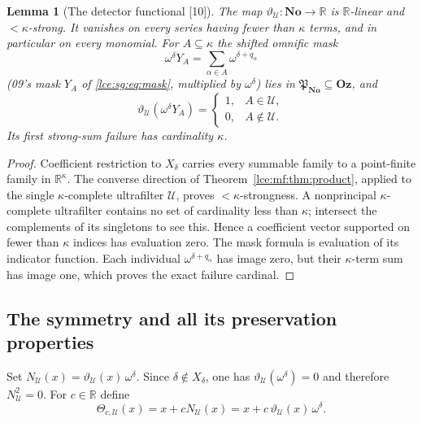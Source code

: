 \documentclass[11pt,letterpaper]{article}
\numberwithin{equation}{section}
\newtheorem{lemma}[theorem]{Lemma}
\theoremstyle{definition}
\theoremstyle{remark}
\newcommand{\No}{\mathbf{No}}
\newcommand{\Oz}{\mathbf{Oz}}
\newcommand{\R}{\mathbb R}
\newcommand{\thref}[1]{Theorem~\ref{#1}}
\newcommand{\src}[1]{\textup{\textsf{\small[#1]}}}%
\begin{document}
\begin{lemma}[The detector functional \src{10}]\label{lce:mf:lem:detector}
The map $\vartheta_{\mathcal U}:\No\to\R$ is $\R$-linear and
${<}\kappa$-strong. It vanishes on every series having fewer than $\kappa$
terms, and in particular on every monomial. For $A\subseteq\kappa$ the
shifted omnific mask
\begin{equation}\label{lce:mf:eq:mask}
 \omega^\delta Y_A=\sum_{\alpha\in A}\omega^{\delta+q_\alpha}
\end{equation}
(09's mask $Y_A$ of \eqref{lce:sg:eq:mask}, multiplied by $\omega^\delta$)
lies in $\mathfrak P_{\No}\subseteq\Oz$, and
\[
 \vartheta_{\mathcal U}(\omega^\delta Y_A)=\begin{cases}1,&A\in\mathcal U,\\
 0,&A\notin\mathcal U.\end{cases}
\]
Its first strong-sum failure has cardinality $\kappa$.
\end{lemma}
\begin{proof}
Coefficient restriction to $X_\delta$ carries every summable family to a
point-finite family in $\R^\kappa$. The converse direction of
\thref{lce:mf:thm:product}, applied to the single $\kappa$-complete
ultrafilter $\mathcal U$, proves ${<}\kappa$-strongness. A nonprincipal
$\kappa$-complete ultrafilter contains no set of cardinality less than
$\kappa$; intersect the complements of its singletons to see this. Hence a
coefficient vector supported on fewer than $\kappa$ indices has evaluation
zero. The mask formula is evaluation of its indicator function. Each
individual $\omega^{\delta+q_\alpha}$ has image zero, but their
$\kappa$-term sum has image one, which proves the exact failure cardinal.
\end{proof}

\subsection{The symmetry and all its preservation properties}
Set $N_{\mathcal U}(x)=\vartheta_{\mathcal U}(x)\,\omega^\delta$. Since
$\delta\notin X_\delta$, one has $\vartheta_{\mathcal U}(\omega^\delta)=0$ and
therefore $N_{\mathcal U}^2=0$. For $c\in\R$ define
\begin{equation}\label{lce:mf:eq:AU}
 \Theta_{c,\mathcal U}(x)=x+cN_{\mathcal U}(x)
   =x+c\,\vartheta_{\mathcal U}(x)\,\omega^\delta.
\end{equation}
\end{document}
